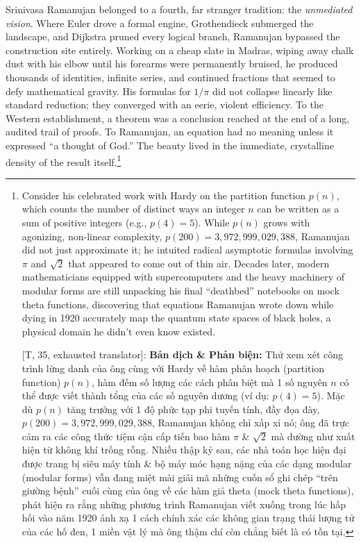 \documentclass[11pt]{article}
\begin{document}
Srinivasa Ramanujan belonged to a fourth, far stranger tradition: the \emph{unmediated vision}. Where Euler drove a formal engine, Grothendieck submerged the landscape, and Dijkstra pruned every logical branch, Ramanujan bypassed the construction site entirely. Working on a cheap slate in Madras, wiping away chalk dust with his elbow until his forearms were permanently bruised, he produced thousands of identities, infinite series, and continued fractions that seemed to defy mathematical gravity. His formulas for $1/\pi$ did not collapse linearly like standard reduction; they converged with an eerie, violent efficiency. To the Western establishment, a theorem was a conclusion reached at the end of a long, audited trail of proofs. To Ramanujan, an equation had no meaning unless it expressed ``a thought of God.'' The beauty lived in the immediate, crystalline density of the result itself.\footnote{Consider his celebrated work with Hardy on the partition function $p(n)$, which counts the number of distinct ways an integer $n$ can be written as a sum of positive integers (e.g., $p(4) = 5$). While $p(n)$ grows with agonizing, non-linear complexity, $p(200) = 3,972,999,029,388$, Ramanujan did not just approximate it; he intuited radical asymptotic formulas involving $\pi$ and $\sqrt{2}$ that appeared to come out of thin air. Decades later, modern mathematicians equipped with supercomputers and the heavy machinery of modular forms are still unpacking his final ``deathbed'' notebooks on mock theta functions, discovering that equations Ramanujan wrote down while dying in 1920 accurately map the quantum state spaces of black holes, a physical domain he didn't even know existed.
	
	\textsf{[T, 35, exhausted translator]:} \textbf{Bản dịch \& Phản biện:} Thử xem xét công trình lừng danh của ông cùng với Hardy về hàm phân hoạch (partition function) $p(n)$, hàm đếm số lượng các cách phân biệt mà 1 số nguyên $n$ có thể được viết thành tổng của các số nguyên dương (ví dụ: $p(4) = 5$). Mặc dù $p(n)$ tăng trưởng với 1 độ phức tạp phi tuyến tính, đầy đọa đày, $p(200) = 3,972,999,029,388$, Ramanujan không chỉ xấp xỉ nó; ông đã trực cảm ra các công thức tiệm cận cấp tiến bao hàm $\pi$ \& $\sqrt{2}$ mà dường như xuất hiện từ không khí trống rỗng. Nhiều thập kỷ sau, các nhà toán học hiện đại được trang bị siêu máy tính \& bộ máy móc hạng nặng của các dạng modular (modular forms) vẫn đang miệt mài giải mã những cuốn sổ ghi chép ``trên giường bệnh'' cuối cùng của ông về các hàm giả theta (mock theta functions), phát hiện ra rằng những phương trình Ramanujan viết xuống trong lúc hấp hối vào năm 1920 ánh xạ 1 cách chính xác các không gian trạng thái lượng tử của các hố đen, 1 miền vật lý mà ông thậm chí còn chẳng biết là có tồn tại.}
\end{document}
